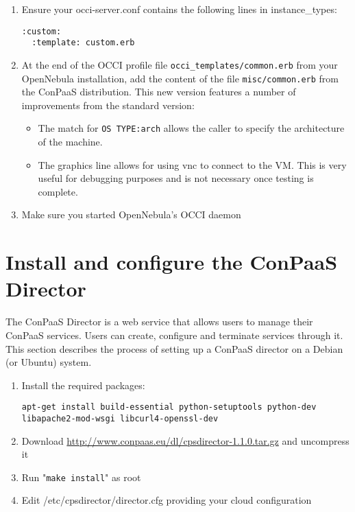 \documentclass[10pt]{article}
\begin{document}
\begin{enumerate}
\item Ensure your occi-server.conf contains the following lines in instance\_types:
\begin{verbatim}
:custom:
  :template: custom.erb
\end{verbatim}
\item At the end of the OCCI profile file \verb+occi_templates/common.erb+ 
  from your OpenNebula installation, add the content of the file
  \verb+misc/common.erb+ from the ConPaaS distribution. This new version 
  features a number of improvements from the standard version:
  \begin{itemize}
  \item The match for \verb+OS TYPE:arch+ allows the caller to specify
    the architecture of the machine.
  \item The graphics line allows for using vnc to connect to the VM.
    This is very useful for debugging purposes and is not necessary
    once testing is complete.

  \end{itemize}

\item Make sure you started OpenNebula's OCCI daemon

\end{enumerate}

\section{Install and configure the ConPaaS Director}
\label{sec:director}

The ConPaaS Director is a web service that allows users to manage their ConPaaS
services. Users can create, configure and terminate services through it. This
section describes the process of setting up a ConPaaS director on a Debian (or
Ubuntu) system.

\begin{enumerate}
\item Install the required packages: 

\texttt{apt-get install build-essential python-setuptools python-dev libapache2-mod-wsgi libcurl4-openssl-dev}
\item Download \url{http://www.conpaas.eu/dl/cpsdirector-1.1.0.tar.gz} and uncompress it
\item Run "\texttt{make install}" as root
\item Edit /etc/cpsdirector/director.cfg providing your cloud configuration
\end{enumerate}
\end{document}
